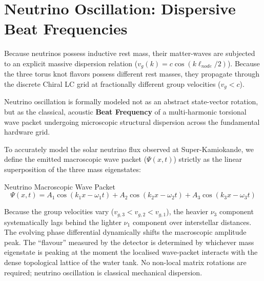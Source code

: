 \section{Neutrino Oscillation: Dispersive Beat Frequencies}
Because neutrinos possess inductive rest mass, their matter-waves are subjected to an explicit massive dispersion relation ($v_g(k) = c \cos(k \ell_{node}/2)$). Because the three torus knot flavors possess different rest masses, they propagate through the discrete Chiral LC grid at fractionally different group velocities ($v_g < c$).

Neutrino oscillation is formally modeled not as an abstract state-vector rotation, but as the classical, acoustic \textbf{Beat Frequency} of a multi-harmonic torsional wave packet undergoing microscopic structural dispersion across the fundamental hardware grid.

To accurately model the solar neutrino flux observed at Super-Kamiokande, we define the emitted macroscopic wave packet ($\Psi(x,t)$) strictly as the linear superposition of the three mass eigenstates:
\begin{resultbox}{Neutrino Macroscopic Wave Packet}
\begin{equation}
    \Psi(x,t) = A_1 \cos(k_1 x - \omega_1 t) + A_2 \cos(k_2 x - \omega_2 t) + A_3 \cos(k_3 x - \omega_3 t)
\end{equation}
\end{resultbox}

Because the group velocities vary ($v_{g,3} < v_{g,2} < v_{g,1}$), the heavier $\nu_3$ component systematically lags behind the lighter $\nu_1$ component over interstellar distances. The evolving phase differential dynamically shifts the macroscopic amplitude peak. The ``flavour'' measured by the detector is determined by whichever mass eigenstate is peaking at the moment the localised wave-packet interacts with the dense topological lattice of the water tank. No non-local matrix rotations are required; neutrino oscillation is classical mechanical dispersion.